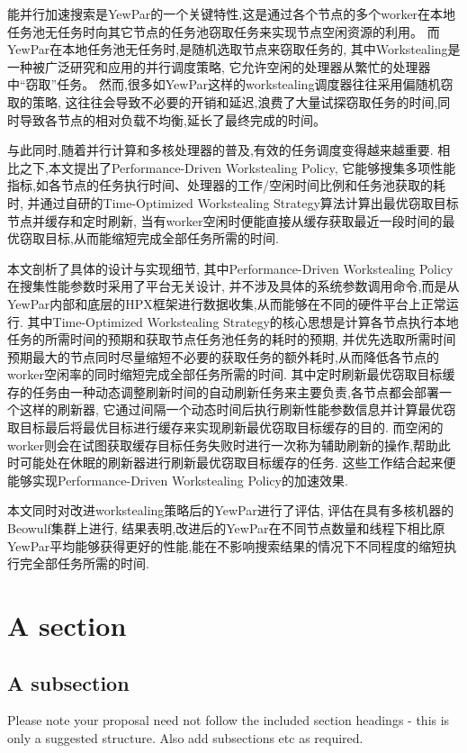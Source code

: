 \documentclass{mproj}
\begin{document}
能并行加速搜索是YewPar的一个关键特性,这是通过各个节点的多个worker在本地任务池无任务时向其它节点的任务池窃取任务来实现节点空闲资源的利用。
而YewPar在本地任务池无任务时,是随机选取节点来窃取任务的,
其中Workstealing是一种被广泛研究和应用的并行调度策略,
它允许空闲的处理器从繁忙的处理器中“窃取”任务。
然而,很多如YewPar这样的workstealing调度器往往采用偏随机窃取的策略,
这往往会导致不必要的开销和延迟,浪费了大量试探窃取任务的时间,同时导致各节点的相对负载不均衡,延长了最终完成的时间。


与此同时,随着并行计算和多核处理器的普及,有效的任务调度变得越来越重要.
相比之下,本文提出了Performance-Driven Workstealing Policy,
它能够搜集多项性能指标,如各节点的任务执行时间、处理器的工作/空闲时间比例和任务池获取的耗时,
并通过自研的Time-Optimized Workstealing Strategy算法计算出最优窃取目标节点并缓存和定时刷新,
当有worker空闲时便能直接从缓存获取最近一段时间的最优窃取目标,从而能缩短完成全部任务所需的时间.


本文剖析了具体的设计与实现细节,
其中Performance-Driven Workstealing Policy在搜集性能参数时采用了平台无关设计,
并不涉及具体的系统参数调用命令,而是从YewPar内部和底层的HPX\cite{10.1145/2676870.2676883}框架进行数据收集,从而能够在不同的硬件平台上正常运行.
其中Time-Optimized Workstealing Strategy的核心思想是计算各节点执行本地任务的所需时间的预期和获取节点任务池任务的耗时的预期,
并优先选取所需时间预期最大的节点同时尽量缩短不必要的获取任务的额外耗时,从而降低各节点的worker空闲率的同时缩短完成全部任务所需的时间.
其中定时刷新最优窃取目标缓存的任务由一种动态调整刷新时间的自动刷新任务来主要负责,各节点都会部署一个这样的刷新器,
它通过间隔一个动态时间后执行刷新性能参数信息并计算最优窃取目标最后将最优目标进行缓存来实现刷新最优窃取目标缓存的目的.
而空闲的worker则会在试图获取缓存目标任务失败时进行一次称为辅助刷新的操作,帮助此时可能处在休眠的刷新器进行刷新最优窃取目标缓存的任务.
这些工作结合起来便能够实现Performance-Driven Workstealing Policy的加速效果.


本文同时对改进workstealing策略后的YewPar进行了评估,
评估在具有多核机器的Beowulf集群上进行,
结果表明,改进后的YewPar在不同节点数量和线程下相比原YewPar平均能够获得更好的性能,能在不影响搜索结果的情况下不同程度的缩短执行完全部任务所需的时间.

\section{A section}

\subsection{A subsection}
Please note your proposal need not follow the included section headings - this is only a suggested structure. Also add subsections etc as required.
\end{document}
